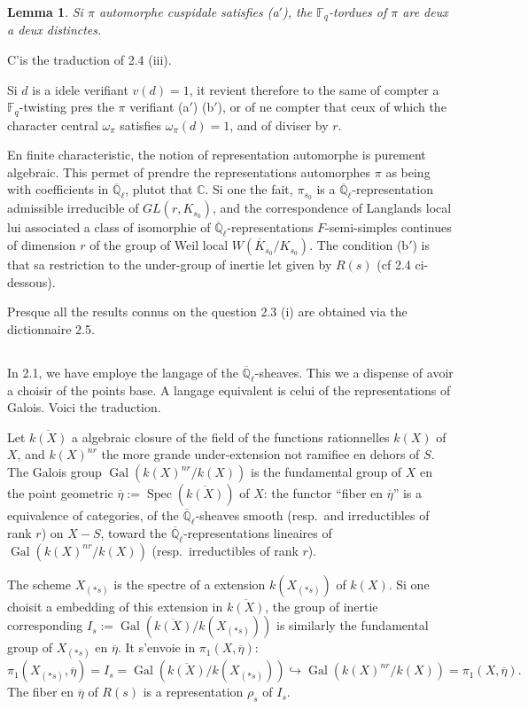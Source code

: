 \documentclass[11pt,a4paper]{article}
\theoremstyle{plain}
\newtheorem{lemma}[theorem]{Lemma}
\theoremstyle{definition}
\DeclareMathOperator{\Spec}{Spec}
\DeclareMathOperator{\Gal}{Gal}
\newcommand{\F}{\mathbb{F}}
\newcommand{\C}{\mathbb{C}}
\newcommand{\Ql}{\overline{\mathbb{Q}}_\ell}
\begin{document}
\begin{lemma}
Si $\pi$ automorphe cuspidale satisfies (a$'$), the $\F_q$-tordues of $\pi$ are deux a deux distinctes.
\end{lemma}
C'is the traduction of 2.4 (iii).

Si $d$ is a idele verifiant $v(d) = 1$, it revient therefore to the same of compter a $\F_q$-twisting pres the $\pi$ verifiant (a$'$) (b$'$), or of ne compter that ceux of which the character central $\omega_\pi$ satisfies $\omega_\pi(d) = 1$, and of diviser by $r$.

En finite characteristic, the notion of representation automorphe is purement algebraic. This permet of prendre the representations automorphes $\pi$ as being with coefficients in $\Ql$, plutot that $\C$. Si one the fait, $\pi_{s_0}$ is a $\Ql$-representation admissible irreducible of $GL(r, K_{s_0})$, and the correspondence of Langlands local lui associated a class of isomorphie of $\Ql$-representations $F$-semi-simples continues of dimension $r$ of the group of Weil local $W(\overline{K}_{s_0}/K_{s_0})$. The condition (b$'$) is that sa restriction to the under-group of inertie let given by $R(s)$ (cf 2.4 ci-dessous).

Presque all the results connus on the question 2.3 (i) are obtained via the dictionnaire 2.5.

\subsection{}
In 2.1, we have employe the langage of the $\Ql$-sheaves. This we a dispense of avoir a choisir of the points base. A langage equivalent is celui of the representations of Galois. Voici the traduction.

Let $\overline{k(X)}$ a algebraic closure of the field of the functions rationnelles $k(X)$ of $X$, and $k(X)^{nr}$ the more grande under-extension not ramifiee en dehors of $S$. The Galois group $\Gal(k(X)^{nr}/k(X))$ is the fundamental group of $X$ en the point geometric $\overline{\eta} := \Spec(\overline{k(X)})$ of $X$: the functor ``fiber en $\overline{\eta}$'' is a equivalence of categories, of the $\Ql$-sheaves smooth (resp.\ and irreductibles of rank $r$) on $X - S$, toward the $\Ql$-representations lineaires of $\Gal(k(X)^{nr}/k(X))$ (resp.\ irreductibles of rank $r$).

The scheme $X_{(*s)}$ is the spectre of a extension $k(X_{(*s)})$ of $k(X)$. Si one choisit a embedding of this extension in $\overline{k(X)}$, the group of inertie corresponding $I_s := \Gal(\overline{k(X)}/k(X_{(*s)}))$ is similarly the fundamental group of $X_{(*s)}$ en $\overline{\eta}$. It s'envoie in $\pi_1(X, \overline{\eta})$:
\begin{equation}
\pi_1(X_{(*s)}, \overline{\eta}) = I_s = \Gal(\overline{k(X)}/k(X_{(*s)})) \hookrightarrow \Gal(k(X)^{nr}/k(X)) = \pi_1(X, \overline{\eta}).
\tag{2.7.1}
\end{equation}
The fiber en $\overline{\eta}$ of $R(s)$ is a representation $\rho_s$ of $I_s$.
\end{document}
